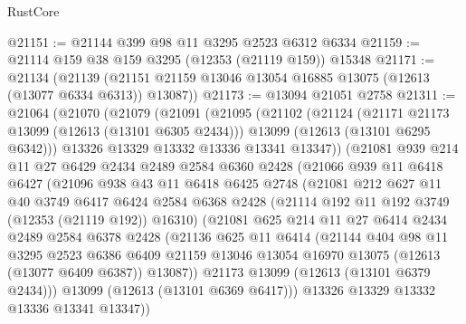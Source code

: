 \begin{lexlean}{RustCore}
\begin{coremodule}
@21151 := @21144 @399 @98 @11 @3295 @2523 @6312 @6334
@21159 := @21114 @159 @38 @159 @3295 (@12353 (@21119 @159)) @15348
@21171 := @21134
    (@21139 (@21151 @21159 @13046 @13054 @16885 @13075 (@12613 (@13077 @6334 @6313)) @13087))
@21173 := @13094 @21051 @2758
@21311 := @21064
    (@21070
      (@21079
        (@21091
          (@21095
            (@21102
              (@21124
                (@21171 @21173 @13099 (@12613 (@13101 @6305 @2434)))
                @13099
                (@12613 (@13101 @6295 @6342)))
              @13326
              @13329
              @13332
              @13336
              @13341
              @13347))
          (@21081
            @939
            @214
            @11
            @27
            @6429
            @2434
            @2489
            @2584
            @6360
            @2428
            (@21066
              @939
              @11
              @6418
              @6427
              (@21096
                @938
                @43
                @11
                @6418
                @6425
                @2748
                (@21081
                  @212
                  @627
                  @11
                  @40
                  @3749
                  @6417
                  @6424
                  @2584
                  @6368
                  @2428
                  (@21114 @192 @11 @192 @3749 (@12353 (@21119 @192)) @16310)
                  (@21081
                    @625
                    @214
                    @11
                    @27
                    @6414
                    @2434
                    @2489
                    @2584
                    @6378
                    @2428
                    (@21136
                      @625
                      @11
                      @6414
                      (@21144
                        @404
                        @98
                        @11
                        @3295
                        @2523
                        @6386
                        @6409
                        @21159
                        @13046
                        @13054
                        @16970
                        @13075
                        (@12613 (@13077 @6409 @6387))
                        @13087))
                    @21173
                    @13099
                    (@12613 (@13101 @6379 @2434)))
                  @13099
                  (@12613 (@13101 @6369 @6417)))
                @13326
                @13329
                @13332
                @13336
                @13341
                @13347))

\end{coremodule}
\end{lexlean}
